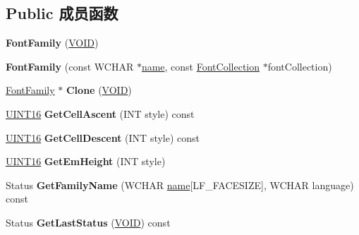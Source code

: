 \subsection*{Public 成员函数}
\begin{DoxyCompactItemize}
\item 
\mbox{\label{class_font_family_a537e220b8994cdfc382d5d84bf99d169}} 
{\bfseries Font\+Family} (\hyperlink{interfacevoid}{V\+O\+ID})
\item 
\mbox{\label{class_font_family_a33794473e0a11855800b8c307021b7fe}} 
{\bfseries Font\+Family} (const W\+C\+H\+AR $\ast$\hyperlink{structname}{name}, const \hyperlink{class_font_collection}{Font\+Collection} $\ast$font\+Collection)
\item 
\mbox{\label{class_font_family_a3b9c42574605b2d02b42e9ae818f213f}} 
\hyperlink{class_font_family}{Font\+Family} $\ast$ {\bfseries Clone} (\hyperlink{interfacevoid}{V\+O\+ID})
\item 
\mbox{\label{class_font_family_a28859da093796ee58129c87cdf72ee28}} 
\hyperlink{_processor_bind_8h_a09f1a1fb2293e33483cc8d44aefb1eb1}{U\+I\+N\+T16} {\bfseries Get\+Cell\+Ascent} (I\+NT style) const
\item 
\mbox{\label{class_font_family_a045ff283578ba54e7e865f73bcfc0c7f}} 
\hyperlink{_processor_bind_8h_a09f1a1fb2293e33483cc8d44aefb1eb1}{U\+I\+N\+T16} {\bfseries Get\+Cell\+Descent} (I\+NT style) const
\item 
\mbox{\label{class_font_family_a36af5872de7e343e52843ed82d1148d1}} 
\hyperlink{_processor_bind_8h_a09f1a1fb2293e33483cc8d44aefb1eb1}{U\+I\+N\+T16} {\bfseries Get\+Em\+Height} (I\+NT style)
\item 
\mbox{\label{class_font_family_abb0c102ebb33da445f5840aa4c0578b6}} 
Status {\bfseries Get\+Family\+Name} (W\+C\+H\+AR \hyperlink{structname}{name}\mbox{[}L\+F\+\_\+\+F\+A\+C\+E\+S\+I\+ZE\mbox{]}, W\+C\+H\+AR language) const
\item 
\mbox{\label{class_font_family_ac68bd5fbbb64b8ccfcd7813858c631b0}} 
Status {\bfseries Get\+Last\+Status} (\hyperlink{interfacevoid}{V\+O\+ID}) const

\end{DoxyCompactItemize}

